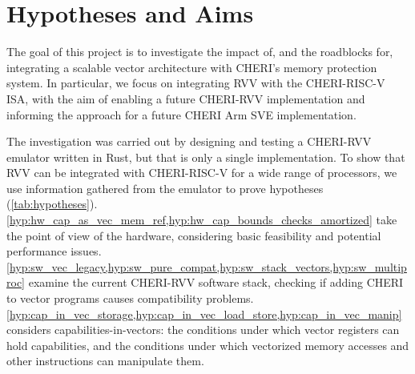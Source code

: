 

\section{Hypotheses and Aims}
The goal of this project is to investigate the impact of, and the roadblocks for, integrating a scalable vector architecture with CHERI's memory protection system.
In particular, we focus on integrating RVV with the CHERI-RISC-V ISA, with the aim of enabling a future CHERI-RVV implementation and informing the approach for a future CHERI Arm SVE implementation.

The investigation was carried out by designing and testing a CHERI-RVV emulator written in Rust, but that is only a single implementation.
To show that RVV can be integrated with CHERI-RISC-V for a wide range of processors, we use information gathered from the emulator to prove  hypotheses (\cref{tab:hypotheses}).
\cref{hyp:hw_cap_as_vec_mem_ref,hyp:hw_cap_bounds_checks_amortized} take the point of view of the hardware, considering basic feasibility and potential performance issues.
\cref{hyp:sw_vec_legacy,hyp:sw_pure_compat,hyp:sw_stack_vectors,hyp:sw_multiproc} examine the current CHERI-RVV software stack, checking if adding CHERI to vector programs causes compatibility problems.
\cref{hyp:cap_in_vec_storage,hyp:cap_in_vec_load_store,hyp:cap_in_vec_manip} considers capabilities-in-vectors: the conditions under which vector registers can hold capabilities, and the conditions under which vectorized memory accesses and other instructions can manipulate them.

